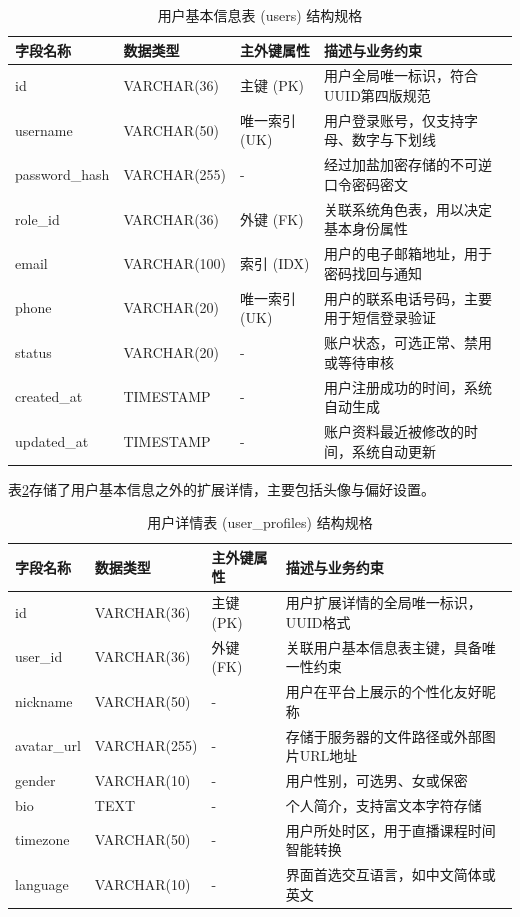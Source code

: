 \begin{table}[H]
\centering
\caption{用户基本信息表 (users) 结构规格}
\label{tab:db-users}
\begin{tabularx}{\textwidth}{lllX}
\toprule
字段名称 & 数据类型 & 主外键属性 & 描述与业务约束 \\
\midrule
id & VARCHAR(36) & 主键 (PK) & 用户全局唯一标识，符合UUID第四版规范 \\
username & VARCHAR(50) & 唯一索引 (UK) & 用户登录账号，仅支持字母、数字与下划线 \\
password\_hash & VARCHAR(255) & - & 经过加盐加密存储的不可逆口令密码密文 \\
role\_id & VARCHAR(36) & 外键 (FK) & 关联系统角色表，用以决定基本身份属性 \\
email & VARCHAR(100) & 索引 (IDX) & 用户的电子邮箱地址，用于密码找回与通知 \\
phone & VARCHAR(20) & 唯一索引 (UK) & 用户的联系电话号码，主要用于短信登录验证 \\
status & VARCHAR(20) & - & 账户状态，可选正常、禁用或等待审核 \\
created\_at & TIMESTAMP & - & 用户注册成功的时间，系统自动生成 \\
updated\_at & TIMESTAMP & - & 账户资料最近被修改的时间，系统自动更新 \\
\bottomrule
\end{tabularx}
\end{table}

表\ref{tab:db-user-profiles}存储了用户基本信息之外的扩展详情，主要包括头像与偏好设置。

\begin{table}[H]
\centering
\caption{用户详情表 (user\_profiles) 结构规格}
\label{tab:db-user-profiles}
\begin{tabularx}{\textwidth}{lllX}
\toprule
字段名称 & 数据类型 & 主外键属性 & 描述与业务约束 \\
\midrule
id & VARCHAR(36) & 主键 (PK) & 用户扩展详情的全局唯一标识，UUID格式 \\
user\_id & VARCHAR(36) & 外键 (FK) & 关联用户基本信息表主键，具备唯一性约束 \\
nickname & VARCHAR(50) & - & 用户在平台上展示的个性化友好昵称 \\
avatar\_url & VARCHAR(255) & - & 存储于服务器的文件路径或外部图片URL地址 \\
gender & VARCHAR(10) & - & 用户性别，可选男、女或保密 \\
bio & TEXT & - & 个人简介，支持富文本字符存储 \\
timezone & VARCHAR(50) & - & 用户所处时区，用于直播课程时间智能转换 \\
language & VARCHAR(10) & - & 界面首选交互语言，如中文简体或英文 \\
\bottomrule
\end{tabularx}
\end{table}

